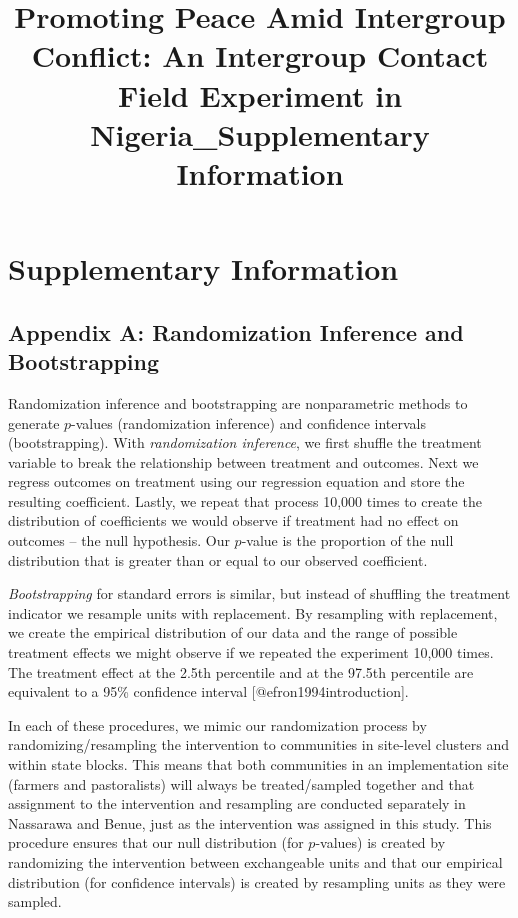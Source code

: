 \documentclass[
]{article}
\title{Promoting Peace Amid Intergroup Conflict: An Intergroup Contact
Field Experiment in Nigeria\_Supplementary Information}
\author{}
\date{\vspace{-2.5em}}
\begin{document}
\maketitle

\hypertarget{supplementary-information}{%
\section{Supplementary Information}\label{supplementary-information}}

\hypertarget{appendix-a-randomization-inference-and-bootstrapping}{%
\subsection{Appendix A: Randomization Inference and
Bootstrapping}\label{appendix-a-randomization-inference-and-bootstrapping}}

Randomization inference and bootstrapping are nonparametric methods to
generate \(p\)-values (randomization inference) and confidence intervals
(bootstrapping). With \emph{randomization inference}, we first shuffle
the treatment variable to break the relationship between treatment and
outcomes. Next we regress outcomes on treatment using our regression
equation and store the resulting coefficient. Lastly, we repeat that
process 10,000 times to create the distribution of coefficients we would
observe if treatment had no effect on outcomes -- the null hypothesis.
Our \(p\)-value is the proportion of the null distribution that is
greater than or equal to our observed coefficient.

\emph{Bootstrapping} for standard errors is similar, but instead of
shuffling the treatment indicator we resample units with replacement. By
resampling with replacement, we create the empirical distribution of our
data and the range of possible treatment effects we might observe if we
repeated the experiment 10,000 times. The treatment effect at the 2.5th
percentile and at the 97.5th percentile are equivalent to a 95\%
confidence interval {[}@efron1994introduction{]}.

In each of these procedures, we mimic our randomization process by
randomizing/resampling the intervention to communities in site-level
clusters and within state blocks. This means that both communities in an
implementation site (farmers and pastoralists) will always be
treated/sampled together and that assignment to the intervention and
resampling are conducted separately in Nassarawa and Benue, just as the
intervention was assigned in this study. This procedure ensures that our
null distribution (for \(p\)-values) is created by randomizing the
intervention between exchangeable units and that our empirical
distribution (for confidence intervals) is created by resampling units
as they were sampled.
\end{document}
